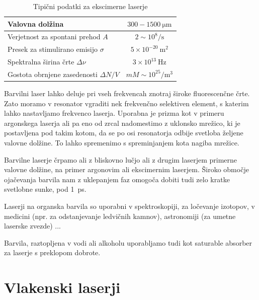 \begin{table}[h]
\begin{center}
\begin{tabular}{|l|c|}\hline
Valovna dolžina  & $300 - 1500~\si{\micro\meter}$\\ \hline
Verjetnost za spontani prehod $A$ & $ 2 \sim 10^8/\si{\second}$ \\ \hline
Presek za stimulirano emisijo $\sigma$ & $5 \times 10^{-20}~\si{\metre}^2$ \\ \hline
Spektralna širina črte $\Delta \nu$ & $3 \times 10^{13}~\si{\hertz}$  \\ \hline
Gostota obrnjene zasedenosti $\Delta N/V$ & $ mM \sim 10^{25}/\si{\metre}^3$ \\ \hline
\end{tabular}
\caption{Tipični podatki za ekscimerne laserje}
\label{tab:ex}
\end{center}
\end{table}

Barvilni laser lahko deluje pri vseh frekvencah znotraj široke
fluorescenčne črte. Zato moramo v resonator vgraditi nek frekvenčno
selektiven element, s katerim lahko nastavljamo frekvenco laserja. Uporabna
je prizma kot v primeru argonskega laserja ali pa eno od zrcal nadomestimo 
z uklonsko mrežico, ki je postavljena pod takim kotom, da se po osi resonatorja odbije svetloba
željene valovne dolžine. To lahko spremenimo s spreminjanjem kota nagiba mrežice.

Barvilne laserje črpamo ali z bliskovno lučjo ali z drugim laserjem primerne 
valovne dolžine, na primer argonovim ali ekscimernim laserjem. 
Široko območje ojačevanja barvila nam z uklepanjem faz omogoča dobiti
tudi zelo kratke svetlobne sunke, pod 1~ps.

Laserji na organska barvila so uporabni v spektroskopiji, za ločevanje izotopov, v 
medicini (npr. za odstanjevanje ledvičnih kamnov), astronomiji (za umetne laserske zvezde) ...

\begin{remark}
Barvila, raztopljena v vodi ali alkoholu uporabljamo tudi kot saturable absorber
za laserje s preklopom dobrote. 
\end{remark}
 
\section{Vlakenski laserji}
